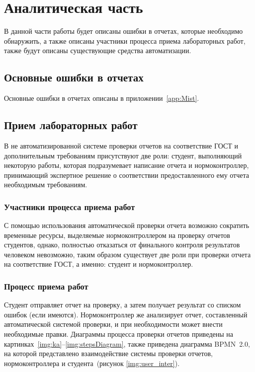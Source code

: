 
\chapter{Аналитическая часть}
В данной части работы будет описаны ошибки в отчетах, которые необходимо обнаружить, а также описаны участники процесса приема лабораторных работ, также будут описаны существующие средства автоматизации.

\section{Основные ошибки в отчетах}
Основные ошибки в отчетах описаны в приложении~\ref{app:Mist}.

\section{Прием лабораторных работ}
В не автоматизированной системе проверки отчетов на соответствие ГОСТ и дополнительным требованиям присутствуют две роли: студент, выполняющий некоторую работы, которая подразумевает написание отчета и нормоконтроллер, принимающий экспертное решение о соответствии предоставленного ему отчета необходимым требованиям.
\subsection{Участники процесса приема работ}
С помощью использования автоматической проверки отчета возможно
сократить временные ресурсы, выделяемые нормоконтроллером на проверку
отчетов студентов, однако, полностью отказаться от финального контроля
результатов человеком невозможно, таким образом существует две роли при
проверки отчета на соответствие ГОСТ, а именно: студент и нормоконтроллер.

\subsection{Процесс приема работ}

Студент отправляет отчет на проверку, а затем получает результат со
списком ошибок (если имеются). Нормоконтроллер же анализирует отчет,
составленный автоматической системой проверки, и при необходимости может
внести необходимые правки. Диаграммы процесса проверки отчетов приведены на картинках~\ref{img:ka}--\ref{img:stepsDiagram}, также приведена диаграмма BPMN~2.0, на которой представлено взаимодействие системы проверки отчетов, нормоконтроллера и студента~(рисунок \ref{img:user_inter}).

